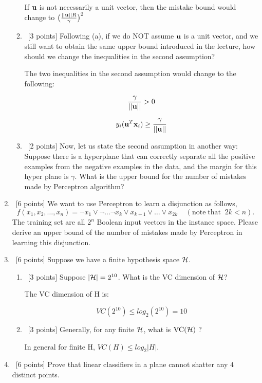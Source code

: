 \documentclass[12pt, fullpage,letterpaper]{article}
\begin{document}
\begin{enumerate}
\begin{enumerate}
		If ${\bf u}$ is not necessarily a unit vector, then the mistake bound would change to $\big(\frac{||{\bf u}|| R}{\gamma}\big)^2$
		
		
		\item~[3 points] Following (a), if we do NOT assume ${\bf u}$ is a unit vector, and we still want to obtain the same upper bound introduced in the lecture, how should we change the inequalities in the second assumption?
		
	The two inequalities in the second assumption would change to the following:
	
	\[
		\frac{\gamma}{||{\bf u}||} > 0
	\]		
	
	\[
		y_i ({\bf u}^T {\bf x}_i) \geq \frac{\gamma}{||{\bf u}||}
	\]
		
		\item~[2 points]  Now, let us state the second assumption in another way: Suppose there is a hyperplane that can correctly separate all the positive examples from the negative examples in the data, and the margin for this hyper plane is $\gamma$. What is the upper bound for the number of mistakes made by Perceptron algorithm?
	\end{enumerate}
	
	\item~[6 points] We want to use Perceptron to learn a disjunction as follows,
	\[
	f(x_1, x_2, \ldots, x_n) = \neg x_1 \lor \neg \ldots \neg x_k \lor x_{k+1} \lor \ldots \lor x_{2k} \;\;\;\;(\mathrm{note\; that}\;\; 2k < n).
	\]
	The training set are all $2^n$ Boolean input vectors in the instance space. 
	Please derive an upper bound of the number of mistakes made by Perceptron in learning this disjunction.

	\item~[6 points] Suppose we have a finite hypothesis space $\mathcal{H}$.
	\begin{enumerate}
		\item~[3 points] Suppose $|\mathcal{H}| = 2^{10}$. What is the VC dimension of $\mathcal{H}$? 

		The VC dimension of H is:
		
		\[
			VC(2^{10}) \leq log_2(2^{10}) = 10		
		\]
				
		
		\item~[3 points] Generally, for  any finite $\mathcal{H}$, what is $\mathrm{VC}(\mathcal{H})$ ?
		
		In general for finite H, $VC(H) \leq log_2 |H|$.
	\end{enumerate}
	\item~[6 points] Prove that linear classifiers in a plane cannot shatter any $4$ distinct points. 


\end{enumerate}
\end{document}
